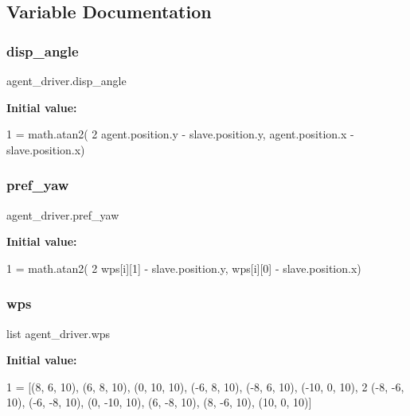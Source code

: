 \subsection{Variable Documentation}
\mbox{\label{namespaceagent__driver_a4911e5b5555613d31fc9b47d3f6706ad}} 
\subsubsection{\texorpdfstring{disp\+\_\+angle}{disp\_angle}}
{\footnotesize\ttfamily agent\+\_\+driver.\+disp\+\_\+angle}

{\bfseries Initial value\+:}
\begin{DoxyCode}
1 =  math.atan2(
2                 agent.position.y - slave.position.y,  agent.position.x - slave.position.x)
\end{DoxyCode}
\mbox{\label{namespaceagent__driver_a653f77a18e690ddc0b64a992197d77e6}} 
\subsubsection{\texorpdfstring{pref\+\_\+yaw}{pref\_yaw}}
{\footnotesize\ttfamily agent\+\_\+driver.\+pref\+\_\+yaw}

{\bfseries Initial value\+:}
\begin{DoxyCode}
1 =  math.atan2(
2             wps[i][1] - slave.position.y, wps[i][0] - slave.position.x)
\end{DoxyCode}
\mbox{\label{namespaceagent__driver_ae417f11b93b9b5d6ad1c182a51f830a5}} 
\subsubsection{\texorpdfstring{wps}{wps}}
{\footnotesize\ttfamily list agent\+\_\+driver.\+wps}

{\bfseries Initial value\+:}
\begin{DoxyCode}
1 =  [(8, 6, 10), (6, 8, 10), (0, 10, 10), (-6, 8, 10), (-8, 6, 10), (-10, 0, 10),
2            (-8, -6, 10), (-6, -8, 10), (0, -10, 10), (6, -8, 10), (8, -6, 10), (10, 0, 10)]
\end{DoxyCode}
